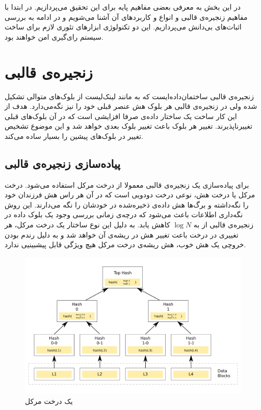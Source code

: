 در این بخش به معرفی بعضی مفاهیم پایه برای این تحقیق می‌پردازیم. در ابتدا با مفاهیم زنجیره‌ی قالبی و انواع و کاربرد‌های آن آشنا می‌شویم و در ادامه به بررسی اثبات‌های بی‌دانش می‌پردازیم. این دو تکنولوژی ابزارهای تئوری لازم برای ساخت سیستم رای‌گیری امن خواهند بود.
\section{زنجیره‌ی قالبی}
زنجیره‌ی قالبی ساختمان‌داده‌ایست که به مانند لینک‌‌لیست
از بلوک‌‌های متوالی تشکیل شده ولی در زنجیره‌ی قالبی هر بلوک هش
عنصر قبلی خود را نیز نگه‌می‌دارد. هدف از این کار ساخت یک ساختار داده‌ی صرفا افزایشی 
است که در آن‌ بلوک‌های قبلی تغییرناپذیرند. تغییر هر بلوک باعث تغییر بلوک بعدی خواهد شد و این موضوع تشخیص تغییر در بلوک‌های پیشین را بسیار ساده می‌کند.
\subsection{پیاده‌سازی زنجیره‌ی قالبی}


برای پیاده‌سازی یک زنجیره‌ی قالبی معمولا از درخت مرکل
 استفاده‌ می‌شود. درخت مرکل یا درخت هش، نوعی درخت دودویی 
 است که در آن هر راس هش فرزندان خود را نگه‌داشته و برگ‌ها هش داده‌ی ذخیره‌شده در خودشان را نگه می‌دارند. این روش نگه‌داری اطلاعات باعث می‌شود که درچه‌ی زمانی بررسی وجود یک بلوک داده در زنجیره‌ی قالبی از 
 به 
$ \log N$
 کاهش یابد. به دلیل این نوع ساختار یک درخت مرکل، هر تغییری در درخت باعت تغییر هش در ریشه‌ی آن خواهد شد و به دلیل رندم بودن خروچی یک هش خوب، هش ریشه‌ی درخت مرکل هیچ ویژگی قابل پیشبینیی ندارد.
 
 \begin{figure}[th!]
 	\centering
 	\includegraphics[width=.7\linewidth]{Hash_Tree.png}
 	\caption {یک درخت مرکل}
 	\label{fig:merkle}
 \end{figure}
 
